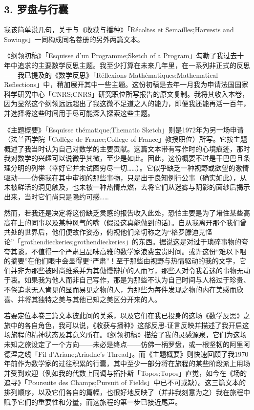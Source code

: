 \subsection{3. 罗盘与行囊}

我该简单说几句，关于与《收获与播种》「Récoltes et Semailles;Harvests and Sowings」一同构成同名卷册的另外两篇文本。

《纲领初稿》「Esquisse d'un Programme;Sketch of a Program」勾勒了我过去十年中追求的主要数学反思主题。我至少打算在未来几年里，在一系列非正式的反思——我已提及的《数学反思》「Réflexions Mathématiques;Mathematical Reflections」中，稍加展开其中一些主题。这份初稿是去年一月我为申请法国国家科学研究中心「CNRS;CNRS」研究职位所写报告的原文复制。我将其收入本卷，因为显然这个纲领远远超出了我这微不足道之人的能力，即便我还能再活一百年，并选择将这些时间用于尽可能深入探索这些主题。

《主题概要》「Esquisse thématique;Thematic Sketch」则是1972年为另一场申请（法兰西学院「Collège de France;College of France」教授职位）所写。它按主题概述了我当时认为自己对数学的主要贡献。这篇文本带有写作时的心境痕迹，那时我对数学的兴趣可以说微乎其微，至少是如此。因此，这份概要不过是干巴巴且条理分明的列举（幸好它并未试图穷尽一切……）。它似乎缺乏一种视野或欲望的激情驱动——仿佛我在其中审视的那些事物，只是出于良知例行公事（确实如此），从未被鲜活的洞见触及，也未被一种热情点燃，去将它们从迷雾与阴影的面纱后揭示出来，当时它们尚只是隐约可感……

然而，若我还是决定将这份缺乏灵感的报告收入此处，恐怕主要是为了堵住某些高高在上的同事以及某种风气的嘴（假设这真能做到的话）。自从我离开那个我们曾共处的世界后，他们便故作姿态，俯视他们亲切称之为“格罗滕迪克怪论”「grothendieckeries;grothendieckeries」的东西。据说这是对过于琐碎事物的夸夸其谈，不值得一个严肃且品味高雅的数学家浪费宝贵时间。或许这份“难以下咽的摘要”在他们眼中会显得更“严肃”！至于那些由视野与热情驱动的我的文字，它们并非为那些被时尚维系并为其傲慢辩护的人而写，那些人对令我着迷的事物无动于衷。如果我为他人而非自己写作，那是为那些不认为自己时间与人格过于珍贵、不倦追求无人肯见的显而易见之物的人，为那些为每件发现之物的内在美感而欣喜、并将其独特之美与其他已知之美区分开来的人。

若要定位本卷三篇文本彼此间的关系，以及它们在我已投身的这场《数学反思》之旅中的各自角色，我可以说，《收获与播种》这部反思-证言反映并描述了我开启这场旅程的精神状态及其意义所在。《纲领初稿》描绘了我的灵感源泉，它们为这场未知之旅设定了一个方向——未必是终点——仿佛一柄罗盘，或一根坚韧的阿里阿德涅之线「Fil d'Ariane;Ariadne's Thread」。而《主题概要》则快速回顾了我1970年前作为数学家的过往积累的行囊，其中至少一部分将在旅程的某些阶段派上用场并受到欢迎（例如我的代数上同调与拓扑斯「Topos;Topos」直觉，如今在《场的追寻》「Poursuite des Champs;Pursuit of Fields」中已不可或缺）。这三篇文本的排列顺序，以及它们各自的篇幅，也很好地反映了（并非我刻意为之）我在旅程中赋予它们的重要性和分量，而这旅程的第一步已接近尾声。